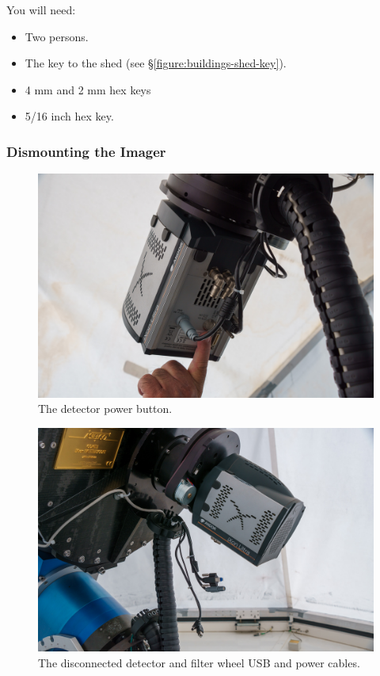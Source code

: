 You will need:

\begin{itemize}
    \item Two persons.
    \item The key to the shed (see \S\ref{figure:buildings-shed-key}).
    \item 4 mm and 2 mm hex keys
    \item 5/16 inch hex key.
\end{itemize}

\subsubsection{Dismounting the Imager}

\begin{figure}
\begin{center}
\includegraphics[width=0.8\linewidth]{figures/huitzi-detector-power-button.jpg}
\end{center}
\caption{The detector power button.}
\label{figure:huitzi-detector-power-button}
\end{figure}

\begin{figure}
\begin{center}
\includegraphics[width=0.8\linewidth]{figures/huitzi-cables-disconnected.jpg}
\end{center}
\caption{The disconnected detector and filter wheel USB and power cables.}
\label{figure:huitzi-cables-disconnected}
\end{figure}

